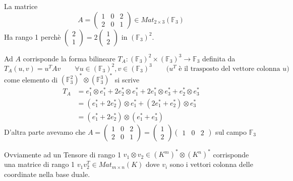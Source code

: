 \documentclass[10pt,a4paper,twoside]{book}
\begin{document}
\begin{example}
    La matrice
    \begin{equation*}
        A = \begin{pmatrix}
            1 & 0 & 2 \\
            2 & 0 & 1
        \end{pmatrix} \in Mat_{2 \times 3}(\mathbb{F}_3)
    \end{equation*}
    Ha rango 1 perchè
    $\begin{pmatrix}
            2 \\
            1
        \end{pmatrix} = 2
        \begin{pmatrix}
            1 \\
            2
        \end{pmatrix}$ in $(\mathbb{F}_3)^2$.

    Ad $A$ corrisponde la forma bilineare $T_A: (\mathbb{F}_3)^2 \times (\mathbb{F}_3)^3 \rightarrow \mathbb{F}_3$ definita da
    \begin{equation*}
        T_A(u, v) = u^T A v \qquad \forall u \in (\mathbb{F}_3)^2, v \in (\mathbb{F}_3)^3 \qquad \text{($u^T$ è il trasposto del vettore colonna $u$)}
    \end{equation*}
    come elemento di $(\mathbb{F}_3^2)^* \otimes (\mathbb{F}_3^3)^*$ si scrive
    \begin{align*}
        T_A & = e_1^* \otimes e_1^* + 2 e_2^* \otimes e_1^* + 2 e_1^* \otimes e_3^* + e_2^* \otimes e_3^* \\
            & = (e_1^* + 2 e_2^*) \otimes e_1^* + (2 e_1^* + e_2^*) \otimes e_3^*                         \\
            & = (e_1^* + 2 e_2^*) \otimes (e_1^* + e_3^*)
    \end{align*}
    D'altra parte avevamo che $A = \begin{pmatrix}
            1 & 0 & 2 \\
            2 & 0 & 1
        \end{pmatrix} = \begin{pmatrix}
            1 \\
            2
        \end{pmatrix} \begin{pmatrix}
            1 & 0 & 2
        \end{pmatrix}$ sul campo $\mathbb{F}_3$
\end{example}

Ovviamente ad un Tensore di rango 1 $v_1 \otimes v_2 \in (K^m)^* \otimes (K^n)^*$ corrisponde una matrice di rango 1 $v_1 v_2^T \in Mat_{m \times n}(K)$ dove $v_i$ sono i vettori colonna delle coordinate nella base duale.
\end{document}
